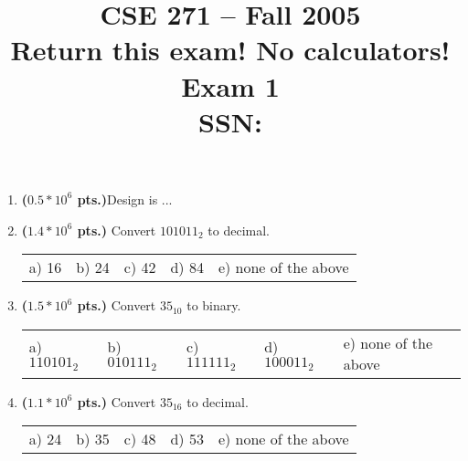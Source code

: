\documentclass{article}
\begin{document}
\newcommand{\SOPmin}{${\rm SOP}_{\rm min} \ $}
\newcommand{\POSmin}{${\rm POS}_{\rm min} \ $}
\newcommand{\bs}{\backslash}


\title{
\Huge{CSE 271 -- Fall 2005}\\
\normalsize{Return this exam!  No calculators!}\\
\normalsize{Exam 1}\\
SSN:}
\date{}

\maketitle{}


\begin{enumerate}
\item {\bf ($0.5*10^6$ pts.)}Design is ...

\item {\bf ($1.4*10^6$ pts.)} Convert $101011_2$ to decimal.

\begin{tabular}{p{0.7in} p{0.7in} p{0.7in} p{0.7in} l}
a) 16 & b) 24 & c) 42 & d) 84 & e) none of the above
\end{tabular}

\item {\bf ($1.5*10^6$ pts.)} Convert $35_{10}$ to binary.

\begin{tabular}{p{0.7in} p{0.7in} p{0.7in} p{0.7in} l}
a) $110101_2$ & b) $010111_2$ & c) $111111_2$ & d) $100011_2$ & e) none of the above
\end{tabular}

\item {\bf ($1.1*10^6$ pts.)} Convert $35_{16}$ to decimal.

\begin{tabular}{p{0.7in} p{0.7in} p{0.7in} p{0.7in} l}
a) 24 & b) 35 & c) 48 & d) 53 & e) none of the above
\end{tabular}


\end{enumerate}
\end{document}
